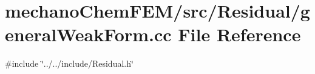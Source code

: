 \section{mechano\+Chem\+F\+E\+M/src/\+Residual/general\+Weak\+Form.cc File Reference}
\label{general_weak_form_8cc}
{\ttfamily \#include \char`\"{}../../include/\+Residual.\+h\char`\"{}}\newline
